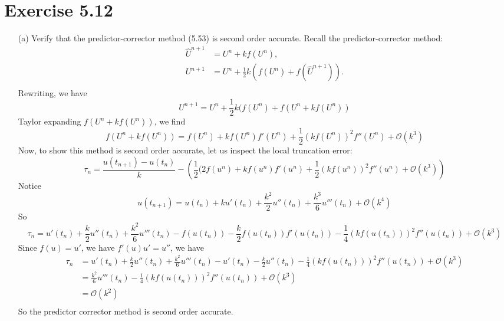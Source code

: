 \documentclass{article}
\begin{document}
\section*{Exercise 5.12}
\begin{enumerate}
    \item[(a)] Verify that the predictor-corrector method (5.53) is second order accurate.
    \newline
    Recall the predictor-corrector method:
    \begin{align*}
        \hat{U}^{n+1} &= U^n + kf(U^n), \\
        U^{n+1} &= U^n + \frac{1}{2}k(f(U^n) + f(\hat{U}^{n+1})). \\
    \end{align*}
    Rewriting, we have
    \[U^{n+1} = U^n + \frac{1}{2}k(f(U^n) + f(U^n + kf(U^n))\]
    Taylor expanding $f(U^n + kf(U^n))$, we find
    \[f(U^n + kf(U^n)) = f(U^n) + kf(U^n)f'(U^n) + \frac{1}{2}(kf(U^n))^2f''(U^n) + \mathcal{O}(k^3)\]
    Now, to show this method is second order accurate, let us inspect the local truncation error:
    \[\tau_n = \frac{u(t_{n+1}) - u(t_n)}{k} - \left(\frac{1}{2}(2f(u^n) + kf(u^n)f'(u^n) + \frac{1}{2}(kf(u^n))^2f''(u^n) + \mathcal{O}(k^3)\right)\]
    Notice 
    \[u(t_{n+1}) = u(t_n) + ku'(t_n) + \frac{k^2}{2}u''(t_n) + \frac{k^3}{6}u'''(t_n) + \mathcal{O}(k^4)\]
    So 
    \[\tau_n = u'(t_n) + \frac{k}{2}u''(t_n) + \frac{k^2}{6}u'''(t_n) - f(u(t_n)) - \frac{k}{2}f(u(t_n))f'(u(t_n)) - \frac{1}{4}(kf(u(t_n)))^2f''(u(t_n)) + \mathcal{O}(k^3)\]
    Since $f(u) = u'$, we have $f'(u)u' = u''$, we have
    \begin{align*}
        \tau_n &= u'(t_n) + \frac{k}{2}u''(t_n) + \frac{k^2}{6}u'''(t_n) - u'(t_n) - \frac{k}{2}u''(t_n) - \frac{1}{4}(kf(u(t_n)))^2f''(u(t_n)) + \mathcal{O}(k^3) \\
        &= \frac{k^2}{6}u'''(t_n) - \frac{1}{4}(kf(u(t_n)))^2f''(u(t_n)) + \mathcal{O}(k^3) \\
        &= \mathcal{O}(k^2) \\
    \end{align*}
    So the predictor corrector method is second order accurate.
    

\end{enumerate}
\end{document}
